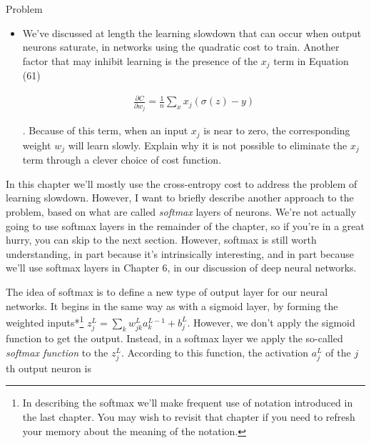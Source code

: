 \begin{exerciseBox}{Problem}


\begin{itemize}

\item 
We've discussed at length the learning slowdown that can occur when output neurons saturate, in networks using the quadratic cost to train. Another factor that may inhibit learning is the presence of the $x_j$ term in Equation (61)


\begin{align*}
\frac{\partial C}{\partial w_j} = \frac{1}{n} \sum_x x_j(\sigma(z)-y) \nonumber
\end{align*}

. Because of this term, when an input $x_j$ is near to zero, the corresponding weight $w_j$ will learn slowly. Explain why it is not possible to eliminate the $x_j$ term through a clever choice of cost function.

\end{itemize}

\end{exerciseBox}





In this chapter we'll mostly use the cross-entropy cost to address the problem of learning slowdown. However, I want to briefly describe another approach to the problem, based on what are called \emph{softmax} layers of neurons. We're not actually going to use softmax layers in the remainder of the chapter, so if you're in a great hurry, you can skip to the next section. However, softmax is still worth understanding, in part because it's intrinsically interesting, and in part because we'll use softmax layers in Chapter 6, in our discussion of deep neural networks.


The idea of softmax is to define a new type of output layer for our neural networks. It begins in the same way as with a sigmoid layer, by forming the weighted inputs*\footnote{In describing the softmax we'll make frequent use of notation introduced in the last chapter. You may wish to revisit that chapter if you need to refresh your memory about the meaning of the notation.} $z^L_j = \sum_{k} w^L_{jk} a^{L-1}_k + b^L_j$. However, we don't apply the sigmoid function to get the output. Instead, in a softmax layer we apply the so-called \emph{softmax function} to the $z^L_j$. According to this function, the activation $a^L_j$ of the $j$th output neuron is

